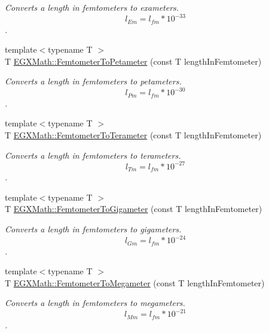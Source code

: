 \begin{DoxyCompactItemize}
\begin{DoxyCompactList}\small\item\em Converts a length in femtometers to exameters. \[ l_{Em}=l_{fm} * 10^{-33} \]. \end{DoxyCompactList}\item 
{\footnotesize template$<$typename T $>$ }\\T \mbox{\hyperlink{group___e_g_x_math-_conversions-_length_conversions-_femtometer-_s_i_ga2145008022cfedfb81e40ceea426cda5}{E\+G\+X\+Math\+::\+Femtometer\+To\+Petameter}} (const T length\+In\+Femtometer)
\begin{DoxyCompactList}\small\item\em Converts a length in femtometers to petameters. \[ l_{Pm}=l_{fm} * 10^{-30} \]. \end{DoxyCompactList}\item 
{\footnotesize template$<$typename T $>$ }\\T \mbox{\hyperlink{group___e_g_x_math-_conversions-_length_conversions-_femtometer-_s_i_ga9b76ed4edddb239375ea2ec8eb1cbc11}{E\+G\+X\+Math\+::\+Femtometer\+To\+Terameter}} (const T length\+In\+Femtometer)
\begin{DoxyCompactList}\small\item\em Converts a length in femtometers to terameters. \[ l_{Tm}=l_{fm} * 10^{-27} \]. \end{DoxyCompactList}\item 
{\footnotesize template$<$typename T $>$ }\\T \mbox{\hyperlink{group___e_g_x_math-_conversions-_length_conversions-_femtometer-_s_i_gaccd849112d6d7fed98d4c4d737ec8872}{E\+G\+X\+Math\+::\+Femtometer\+To\+Gigameter}} (const T length\+In\+Femtometer)
\begin{DoxyCompactList}\small\item\em Converts a length in femtometers to gigameters. \[ l_{Gm}=l_{fm} * 10^{-24} \]. \end{DoxyCompactList}\item 
{\footnotesize template$<$typename T $>$ }\\T \mbox{\hyperlink{group___e_g_x_math-_conversions-_length_conversions-_femtometer-_s_i_gac6c32f00b8dbf147521bdcfeb39b57f2}{E\+G\+X\+Math\+::\+Femtometer\+To\+Megameter}} (const T length\+In\+Femtometer)
\begin{DoxyCompactList}\small\item\em Converts a length in femtometers to megameters. \[ l_{Mm}=l_{fm} * 10^{-21} \]. \end{DoxyCompactList}\item 

\end{DoxyCompactItemize}
